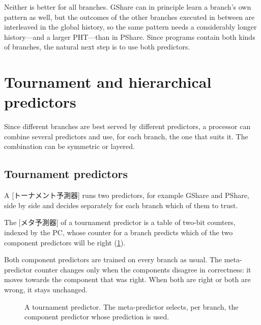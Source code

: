 \documentclass[../main.tex]{subfiles}
\begin{document}
Neither is better for all branches.  GShare can in
principle learn a branch's
own pattern as well, but the outcomes of the other branches executed in
between are interleaved in the global history, so the same pattern needs a
considerably longer history---and a larger PHT---than in PShare.  Since
programs contain both kinds of branches, the natural next step is to use both
predictors.

\section{Tournament and hierarchical predictors}
\label{sec:l04-hybrid}

Since different branches are best served by different predictors, a
processor can combine several predictors and use, for each branch, the one
that suits it.  The combination can be symmetric or layered.

\subsection{Tournament predictors}

A [トーナメント予測器] runs two predictors, for
example GShare and PShare, side by side and decides separately for each
branch which of them to trust.

\begin{definition}
  The [メタ予測器] of a tournament predictor is a
  table of two-bit counters, indexed by the PC, whose counter for a branch
  predicts which of the two component predictors will be right
  (\cref{fig:l04-tournament}).
\end{definition}

Both component predictors are trained on every branch as usual.  The meta-predictor counter changes only when the components
disagree in correctness: it moves towards the component that was right.
When both are right or both are wrong, it stays unchanged.

\begin{figure}[htbp]
  \centering
  
  \caption{A tournament predictor.  The meta-predictor selects, per branch,
    the component predictor whose prediction is used.}
  \label{fig:l04-tournament}
\end{figure}
\end{document}
